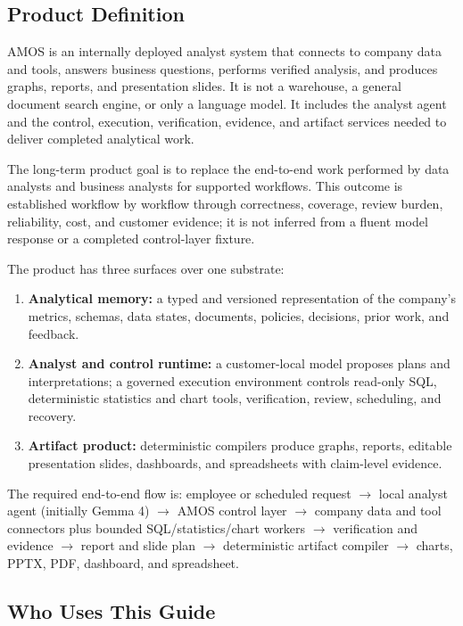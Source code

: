 \documentclass[10pt]{article}
\newcommand{\amos}{\textsc{AMOS}\xspace}
\begin{document}
\subsection{Product Definition}

\amos is an internally deployed analyst system that connects to company data and tools, answers business questions, performs verified analysis, and produces graphs, reports, and presentation slides. It is not a warehouse, a general document search engine, or only a language model. It includes the analyst agent and the control, execution, verification, evidence, and artifact services needed to deliver completed analytical work.

The long-term product goal is to replace the end-to-end work performed by data analysts and business analysts for supported workflows. This outcome is established workflow by workflow through correctness, coverage, review burden, reliability, cost, and customer evidence; it is not inferred from a fluent model response or a completed control-layer fixture.

The product has three surfaces over one substrate:
\begin{enumerate}
  \item \textbf{Analytical memory:} a typed and versioned representation of the company's metrics, schemas, data states, documents, policies, decisions, prior work, and feedback.
  \item \textbf{Analyst and control runtime:} a customer-local model proposes plans and interpretations; a governed execution environment controls read-only SQL, deterministic statistics and chart tools, verification, review, scheduling, and recovery.
  \item \textbf{Artifact product:} deterministic compilers produce graphs, reports, editable presentation slides, dashboards, and spreadsheets with claim-level evidence.
\end{enumerate}

The required end-to-end flow is: employee or scheduled request $\rightarrow$ local analyst agent (initially Gemma 4) $\rightarrow$ \amos control layer $\rightarrow$ company data and tool connectors plus bounded SQL/statistics/chart workers $\rightarrow$ verification and evidence $\rightarrow$ report and slide plan $\rightarrow$ deterministic artifact compiler $\rightarrow$ charts, PPTX, PDF, dashboard, and spreadsheet.

\subsection{Who Uses This Guide}
\end{document}
